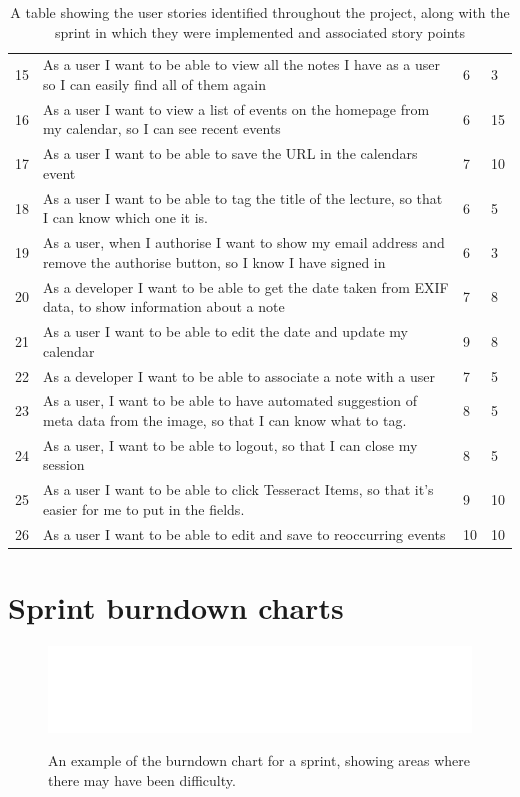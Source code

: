 \begin{table}[h!]
\begin{tabular}{||p{1cm} p{10cm} p{1cm} p{1cm}||}
 15&As a user I want to be able to view all the notes I have as a user so I can easily find all of them again&6&3 \\
 16&As a user I want to view a list of events on the homepage from my calendar, so I can see recent events&6&15 \\
 17&As a user I want to be able to save the URL in the calendars event&7&10 \\
 18&As a user I want to be able to tag the title of the lecture, so that I can know which one it is.&6&5 \\
 19&As a user, when I authorise I want to show my email address and remove the authorise button, so I know I have signed in&6&3 \\
 20&As a developer I want to be able to get the date taken from EXIF data, to show information about a note&7&8 \\
 21&As a user I want to be able to edit the date and update my calendar&9&8 \\
 22&As a developer I want to be able to associate a note with a user&7&5 \\
 23&As a user, I want to be able to have automated suggestion of meta data from the image, so that I can know what to tag.&8&5 \\
 24&As a user, I want to be able to logout, so that I can close my session&8&5 \\
 25&As a user I want to be able to click Tesseract Items, so that it's easier for me to put in the fields.&9&10 \\
 26&As a user I want to be able to edit and save to reoccurring events&10&10 \\
 \hline
 \end{tabular}
 \caption{A table showing the user stories identified throughout the project, along with the sprint in which they were implemented and associated story points}
\end{table}

\section{Sprint burndown charts}
\begin{figure}[H]
  \centering
  \includegraphics{images/sprint-5-burndownchart}
  \label{fig:sprint-burndown}
  \caption{An example of the burndown chart for a sprint, showing areas where there may have been difficulty.}
\end{figure}

